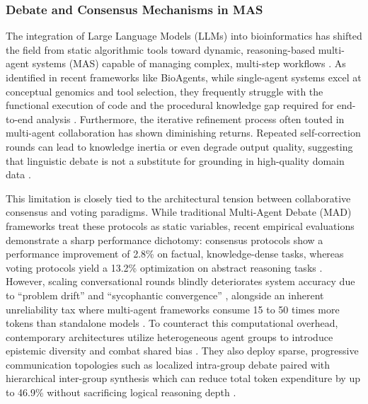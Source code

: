 \documentclass{article}
\begin{document}
\subsubsection{Debate and Consensus Mechanisms in MAS}
The integration of Large Language Models (LLMs) into bioinformatics has shifted the field from static algorithmic tools toward dynamic, reasoning-based multi-agent systems (MAS) capable of managing complex, multi-step workflows \cite{mehandru2025bioagents, yang2025rise}. As identified in recent frameworks like BioAgents, while single-agent systems excel at conceptual genomics and tool selection, they frequently struggle with the functional execution of code and the procedural knowledge gap required for end-to-end analysis \cite{mehandru2025bioagents}. Furthermore, the iterative refinement process often touted in multi-agent collaboration has shown diminishing returns. Repeated self-correction rounds can lead to knowledge inertia or even degrade output quality, suggesting that linguistic debate is not a substitute for grounding in high-quality domain data  \cite{mehandru2025bioagents, zhou2025streamline}. 
  
This limitation is closely tied to the architectural tension between collaborative consensus and voting paradigms. While traditional Multi-Agent Debate (MAD) frameworks treat these protocols as static variables, recent empirical evaluations demonstrate a sharp performance dichotomy: consensus protocols show a performance improvement of 2.8\% on factual, knowledge-dense tasks, whereas voting protocols yield a 13.2\% optimization on abstract reasoning tasks \cite{kaesberg2025voting}. However, scaling conversational rounds blindly deteriorates system accuracy due to ``problem drift'' and ``sycophantic convergence'' \cite{kaesberg2025voting}, alongside an inherent unreliability tax where multi-agent frameworks consume 15 to 50 times more tokens than standalone models \cite{spieser2026review}. To counteract this computational overhead, contemporary architectures utilize heterogeneous agent groups to introduce epistemic diversity and combat shared bias \cite{liu2026heterogeneous}. They also deploy sparse, progressive communication topologies such as localized intra-group debate paired with hierarchical inter-group synthesis which can reduce total token expenditure by up to 46.9\% without sacrificing logical reasoning depth \cite{liu2024groupdebate}. 
    
\end{document}
